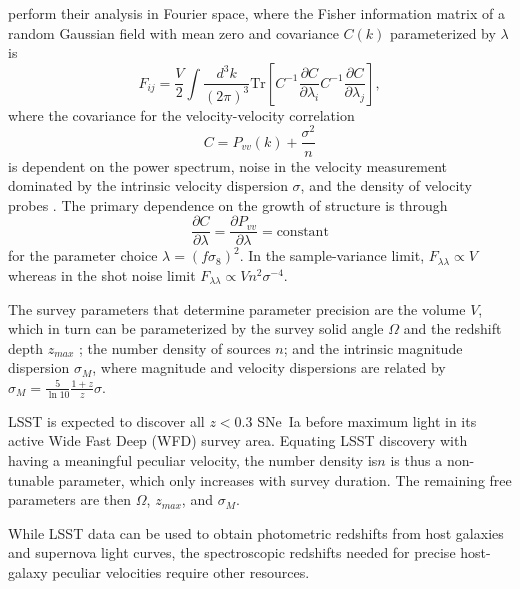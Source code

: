 \documentclass{aastex62}   	%
\begin{document}
\citet{2017ApJ...847..128H} perform their analysis in Fourier space, 
where the Fisher information matrix of a random Gaussian field with mean zero and covariance $C(k)$ parameterized by $\lambda$ is
\begin{equation}
F_{ij} = \frac{V}{2}\int \frac{d^3k}{(2\pi)^3} \text{Tr}\left[ C^{-1} \frac{\partial C}{\partial \lambda_i} C^{-1}
\frac{\partial C}{\partial \lambda_j} \right],
\end{equation}
where the covariance for the velocity-velocity correlation
\begin{equation}
C = P_{vv}(k) + \frac{\sigma^2}{n}
\label{cov:eq}
\end{equation}
is dependent on the power spectrum, noise in the velocity measurement dominated by the intrinsic velocity dispersion $\sigma$, and the density of velocity probes
\citep{2017MNRAS.464.2517H}.  
The primary dependence on the growth of structure is through
\begin{equation}
\frac{\partial C}{\partial \lambda} = \frac{\partial P_{vv}}{\partial \lambda} = \text{constant}
\end{equation}
for the parameter choice
$\lambda=(f\sigma_8)^2$.  In the sample-variance limit, $F_{\lambda \lambda} \propto V$ whereas in the shot noise limit $F_{\lambda \lambda} \propto V n^2 \sigma^{-4}$.


The survey parameters that determine parameter precision are the volume $V$, which
in turn can be parameterized by the survey solid angle $\Omega$ and the redshift depth $z_{max}$ ; the number density of sources $n$; and the intrinsic
magnitude dispersion $\sigma_M$, where magnitude and velocity dispersions are related by $\sigma_{M} = \frac{5}{\ln{10}} \frac{1+z}{z} \sigma$.

LSST is expected to discover all $z<0.3$ SNe~Ia before maximum light in its active Wide Fast Deep (WFD) survey area.
Equating LSST discovery with having a meaningful peculiar velocity, the number density is$n$ is thus a non-tunable parameter, which only increases with survey duration.
The remaining free parameters are then $\Omega$, $z_{max}$, and $\sigma_M$.

While LSST data can be used to obtain photometric redshifts from host galaxies and supernova light curves, the spectroscopic
redshifts needed for precise host-galaxy peculiar velocities require other resources.
\end{document}
